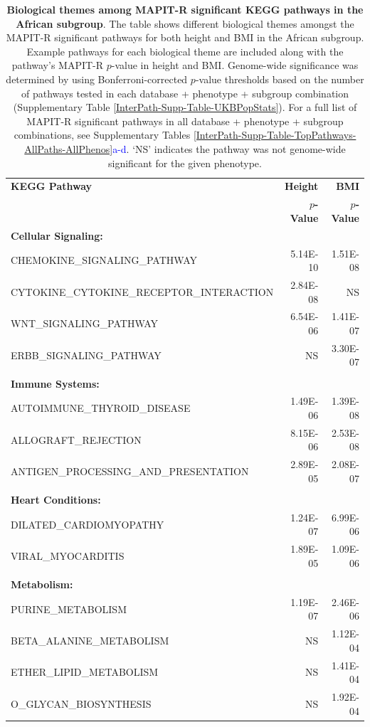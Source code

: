 \documentclass[12pt,a4paper]{article}
\begin{document}
\begin{table}[ht]
\centering
\begin{tabular}{lrr}
  \hline
\textbf{KEGG Pathway} & \textbf{Height} & \textbf{BMI} \\ 
& \textbf{$p$-Value} & \textbf{$p$-Value} \\ 
  \hline
  \textbf{Cellular Signaling:} & & \\
 CHEMOKINE\_SIGNALING\_PATHWAY & 5.14E-10 & 1.51E-08 \\
 CYTOKINE\_CYTOKINE\_RECEPTOR\_INTERACTION & 2.84E-08 & NS \\
 WNT\_SIGNALING\_PATHWAY & 6.54E-06 & 1.41E-07 \\
 ERBB\_SIGNALING\_PATHWAY & NS & 3.30E-07 \\
  \\
  \textbf{Immune Systems:} & & \\
  AUTOIMMUNE\_THYROID\_DISEASE & 1.49E-06 & 1.39E-08 \\
  ALLOGRAFT\_REJECTION & 8.15E-06 & 2.53E-08 \\
  ANTIGEN\_PROCESSING\_AND\_PRESENTATION & 2.89E-05 & 2.08E-07 \\
  \\
  \textbf{Heart Conditions:} & & \\
  DILATED\_CARDIOMYOPATHY & 1.24E-07 & 6.99E-06 \\
  VIRAL\_MYOCARDITIS & 1.89E-05 & 1.09E-06 \\
  \\
  \textbf{Metabolism:} & & \\
  PURINE\_METABOLISM & 1.19E-07 & 2.46E-06 \\
  BETA\_ALANINE\_METABOLISM & NS & 1.12E-04 \\
  ETHER\_LIPID\_METABOLISM & NS & 1.41E-04 \\
  O\_GLYCAN\_BIOSYNTHESIS & NS & 1.92E-04 \\
   \hline
\end{tabular}
  \caption{\textbf{Biological themes among MAPIT-R significant KEGG pathways in the African subgroup}. The table shows different biological themes amongst the MAPIT-R significant pathways for both height and BMI in the African subgroup. Example pathways for each biological theme are included along with the pathway's MAPIT-R $p$-value in height and BMI. Genome-wide significance was determined by using Bonferroni-corrected $p$-value thresholds based on the number of pathways tested in each database + phenotype + subgroup combination (Supplementary Table \ref{InterPath-Supp-Table-UKBPopStats}). For a full list of MAPIT-R significant pathways in all database + phenotype + subgroup combinations, see Supplementary Tables \ref{InterPath-Supp-Table-TopPathways-AllPaths-AllPhenos}\textcolor{blue}{a-d}. `NS' indicates the pathway was not genome-wide significant for the given phenotype.}
\label{InterPath-Main-Table-KEGG-African-TopPathways-Themes}
\end{table}
\end{document}

